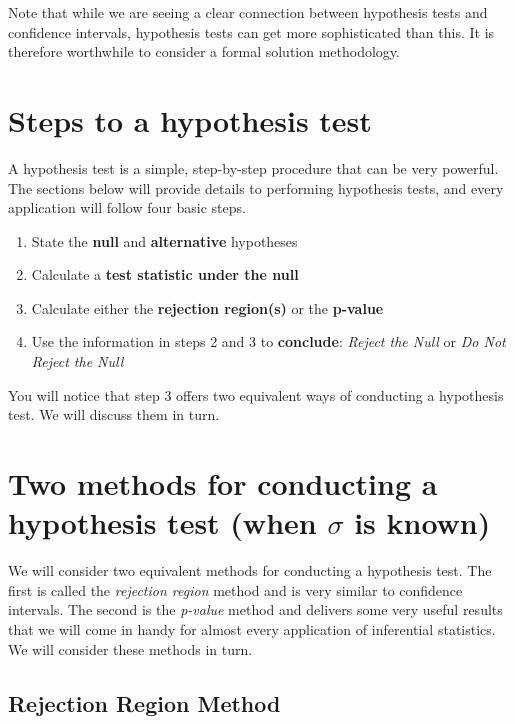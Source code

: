\documentclass[
]{book}
\begin{document}
Note that while we are seeing a clear connection between hypothesis tests and confidence intervals, hypothesis tests can get more sophisticated than this. It is therefore worthwhile to consider a formal solution methodology.

\section{Steps to a hypothesis test}\label{steps-to-a-hypothesis-test}

A hypothesis test is a simple, step-by-step procedure that can be very powerful. The sections below will provide details to performing hypothesis tests, and every application will follow four basic steps.

\begin{enumerate}
\def\labelenumi{\arabic{enumi}.}
\item
  State the \textbf{null} and \textbf{alternative} hypotheses
\item
  Calculate a \textbf{test statistic under the null}
\item
  Calculate either the \textbf{rejection region(s)} or the \textbf{p-value}
\item
  Use the information in steps 2 and 3 to \textbf{conclude}: \emph{Reject the Null} or \emph{Do Not Reject the Null}
\end{enumerate}

You will notice that step 3 offers two equivalent ways of conducting a hypothesis test. We will discuss them in turn.

\section{\texorpdfstring{Two methods for conducting a hypothesis test (when \(\sigma\) is known)}{Two methods for conducting a hypothesis test (when \textbackslash sigma is known)}}\label{two-methods-for-conducting-a-hypothesis-test-when-sigma-is-known}

We will consider two equivalent methods for conducting a hypothesis test. The first is called the \emph{rejection region} method and is very similar to confidence intervals. The second is the \emph{p-value} method and delivers some very useful results that we will come in handy for almost every application of inferential statistics. We will consider these methods in turn.

\subsection{Rejection Region Method}\label{rejection-region-method}
\end{document}
